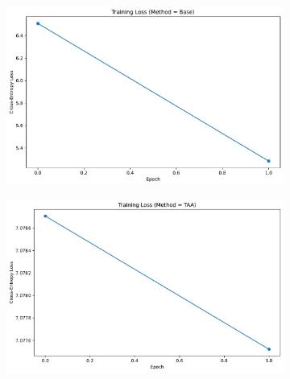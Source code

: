 \documentclass{article} %
\begin{document}
\begin{figure}[H]
  \centering
  \begin{subfigure}[H]{0.48\linewidth}
    \centering
    \includegraphics[width=\linewidth]{ images/training_loss_base_pair1.pdf }
  \end{subfigure}
  \begin{subfigure}[H]{0.48\linewidth}
    \centering
    \includegraphics[width=\linewidth]{ images/training_loss_taa_pair1.pdf }
  \end{subfigure}
\end{figure}
\end{document}
